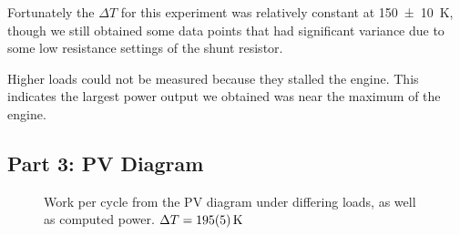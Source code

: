 \documentclass[a4paper]{scrartcl}
\begin{document}
Fortunately the \(\Delta T\) for this experiment was relatively constant at \SI{150 \pm 10}{\kelvin}, though we still obtained some data points that had significant variance due to some low resistance settings of the shunt resistor.

Higher loads could not be measured because they stalled the engine. This indicates the largest power output we obtained was near the maximum of the engine.

\subsection{Part 3: PV Diagram}
\begin{figure}
    \centering
    \caption{Work per cycle from the PV diagram under differing loads, as well as computed power. \(\Delta T = \SI{195 \pm 5}{\kelvin}\)}
    \label{fig:part3}
\end{figure}
\end{document}
